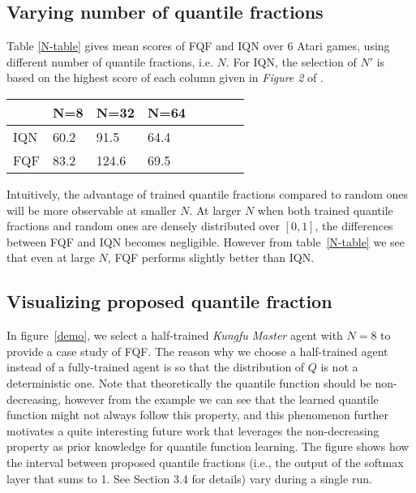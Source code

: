 \documentclass{article}
\begin{document}
\subsection*{Varying number of quantile fractions}
Table \ref{N-table} gives mean scores of FQF and IQN over 6 Atari games, using different number of quantile fractions, i.e. $N$. For IQN, the selection of $N'$ is based on the highest score of each column given in \textit{Figure 2} of \citep{dabney2018implicit}. 

\begin{table*}[ht!]
	\centering
    \begin{tabular}{llllllll}
		\hline \hline
		& N=8 & N=32 & N=64\\
		\midrule
		IQN & 60.2 & 91.5 & 64.4\\
		FQF & 83.2 & 124.6 & 69.5
	\end{tabular}
\caption{Mean scores across 6 Atari 2600 games, measured as percentages of human baseline. Scores are averages over 3 seeds.} \label{N-table}
\end{table*}

Intuitively, the advantage of trained quantile fractions compared to random ones will be more observable at smaller $N$. At larger $N$ when both trained quantile fractions and random ones are densely distributed over $[0, 1]$, the differences between FQF and IQN becomes negligible. However from table~\ref{N-table} we see that even at large $N$, FQF performs slightly better than IQN.

\subsection*{Visualizing proposed quantile fraction}
In figure~\ref{demo}, we select a half-trained \textit{Kungfu Master} agent with $N=8$ to provide a case study of FQF. The reason why we choose a half-trained agent instead of a fully-trained agent is so that the distribution of $Q$ is not a deterministic one. Note that theoretically the quantile function should be non-decreasing, however from the example we can see that the learned quantile function might not always follow this property, and this phenomenon further motivates a quite interesting future work that leverages the non-decreasing property as prior knowledge for quantile function learning. The figure shows how the interval between proposed quantile fractions (i.e., the output of the softmax layer that sums to 1. See Section 3.4 for details) vary during a single run.
\end{document}
